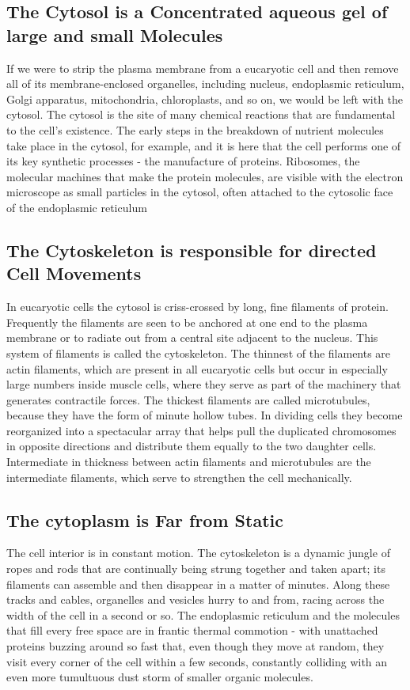 \subsection{The Cytosol is a Concentrated aqueous gel of large and
small Molecules}

If we were to strip the plasma membrane from a eucaryotic cell and then
remove all of its membrane-enclosed organelles, including nucleus,
endoplasmic reticulum, Golgi apparatus, mitochondria, chloroplasts, and
so on, we would be left with the cytosol. The cytosol is the site of many chemical
reactions that are fundamental to the cell’s existence. The early steps
in the breakdown of nutrient molecules take place in the cytosol, for
example, and it is here that the cell performs one of its key synthetic processes
- the manufacture of proteins. Ribosomes, the molecular machines
that make the protein molecules, are visible with the electron microscope
as small particles in the cytosol, often attached to the cytosolic face of the
endoplasmic reticulum

\subsection{The Cytoskeleton is responsible for directed Cell Movements}

In eucaryotic cells the cytosol is criss-crossed by long, fine filaments of protein. Frequently the
filaments are seen to be anchored at one end to the plasma membrane
or to radiate out from a central site adjacent to the nucleus. This system of
filaments is called the cytoskeleton. The thinnest
of the filaments are actin filaments, which are present in all eucaryotic
cells but occur in especially large numbers inside muscle cells, where
they serve as part of the machinery that generates contractile forces. The
thickest filaments are called microtubules, because they have the form of
minute hollow tubes. In dividing cells they become reorganized into a
spectacular array that helps pull the duplicated chromosomes in opposite
directions and distribute them equally to the two daughter cells.
Intermediate in thickness between actin filaments and microtubules are the
intermediate filaments, which serve to strengthen the cell
mechanically.

\subsection{The cytoplasm is Far from Static}

The cell interior is in constant motion. The cytoskeleton is a dynamic
jungle of ropes and rods that are continually being strung together and
taken apart; its filaments can assemble and then disappear in a matter
of minutes. Along these tracks and cables, organelles and
vesicles hurry to and from, racing across the width of the cell in a second or so. The
endoplasmic reticulum and the molecules that fill every free space are in
frantic thermal commotion - with unattached proteins buzzing around
so fast that, even though they move at random, they visit every corner
of the cell within a few seconds, constantly colliding with an even more
tumultuous dust storm of smaller organic molecules.

